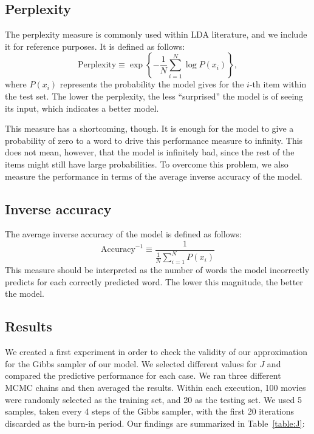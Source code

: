 \documentclass{article} %
\begin{document}
\subsection{Perplexity}

The perplexity measure is commonly used within LDA literature, and we include it for reference purposes. 
It is defined as follows:
\begin{equation}
\text{Perplexity} \equiv \exp \left\{ -\frac{1}{N} \sum_{i = 1}^N \log P(x_i)  \right\},
\end{equation}
where \(P(x_i)\) represents the probability the model gives for the $i$-th item within the test set. The lower the perplexity, the less ``surprised'' the model is of seeing its input, which indicates a better model.

This measure has a shortcoming, though. 
It is enough for the model to give a probability of zero to a word to drive this performance measure to infinity. 
This does not mean, however, that the model is infinitely bad, since the rest of the items might still have large probabilities.
To overcome this problem, we also measure the performance in terms of the average inverse accuracy of the model.

\subsection{Inverse accuracy}

The average inverse accuracy of the model is defined as follows:
\begin{equation}
\text{Accuracy}^{-1} \equiv \frac{1}{\frac{1}{N}\sum_{i = 1}^N P(x_i)}
\end{equation}
This measure should be interpreted as the number of words the model incorrectly predicts for each correctly predicted word. 
The lower this magnitude, the better the model.

\subsection{Results}

We created a first experiment in order to check the validity of our approximation for the Gibbs sampler of our model. 
We selected different values for $J$ and compared the predictive performance for each case. 
We ran three different MCMC chains and then averaged the results. 
Within each execution, 100 movies were randomly selected as the training set, and 20 as the testing set. 
We used 5 samples, taken every 4 steps of the Gibbs sampler, with the first 20 iterations discarded as the burn-in period. 
Our findings are summarized in Table~\ref{table:J}:
\end{document}
